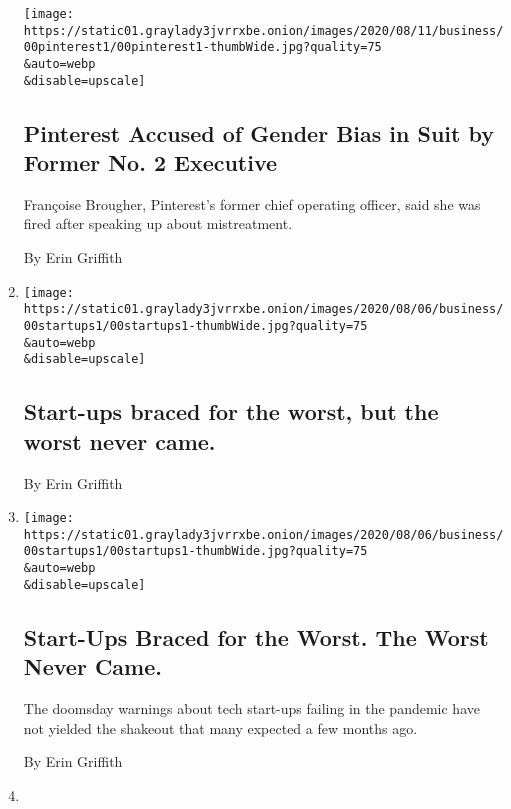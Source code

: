 \begin{enumerate}
  \texttt{[image: https://static01.graylady3jvrrxbe.onion/images/2020/08/11/business/00pinterest1/00pinterest1-thumbWide.jpg?quality=75\\\&auto=webp\\\&disable=upscale]}

  \hypertarget{pinterest-accused-of-gender-bias-in-suit-by-former-no-2-executive}{%
  \subsection{Pinterest Accused of Gender Bias in Suit by Former No. 2
  Executive}\label{pinterest-accused-of-gender-bias-in-suit-by-former-no-2-executive}}

  Françoise Brougher, Pinterest's former chief operating officer, said
  she was fired after speaking up about mistreatment.

  By Erin Griffith
\item
  \href{/2020/08/10/business/start-ups-braced-for-the-worst-but-the-worst-never-came.html}{}

  \texttt{[image: https://static01.graylady3jvrrxbe.onion/images/2020/08/06/business/00startups1/00startups1-thumbWide.jpg?quality=75\\\&auto=webp\\\&disable=upscale]}

  \hypertarget{start-ups-braced-for-the-worst-but-the-worst-never-came}{%
  \subsection{Start-ups braced for the worst, but the worst never
  came.}\label{start-ups-braced-for-the-worst-but-the-worst-never-came}}

  By Erin Griffith
\item
  \href{/2020/08/10/technology/start-ups-pandemic-silicon-valley.html}{}

  \texttt{[image: https://static01.graylady3jvrrxbe.onion/images/2020/08/06/business/00startups1/00startups1-thumbWide.jpg?quality=75\\\&auto=webp\\\&disable=upscale]}

  \hypertarget{start-ups-braced-for-the-worst-the-worst-never-came}{%
  \subsection{Start-Ups Braced for the Worst. The Worst Never
  Came.}\label{start-ups-braced-for-the-worst-the-worst-never-came}}

  The doomsday warnings about tech start-ups failing in the pandemic
  have not yielded the shakeout that many expected a few months ago.

  By Erin Griffith
\item
  \href{/live/2020/07/29/technology/tech-ceos-hearing-testimony/big-techs-rivals-spoke-out-ahead-of-the-hearing}{}


\end{enumerate}
